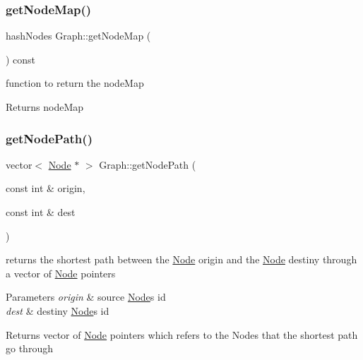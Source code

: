 \subsubsection{\texorpdfstring{get\+Node\+Map()}{getNodeMap()}}
{\footnotesize\ttfamily hash\+Nodes Graph\+::get\+Node\+Map (\begin{DoxyParamCaption}{ }\end{DoxyParamCaption}) const}



function to return the node\+Map 

\begin{DoxyReturn}{Returns}
node\+Map 
\end{DoxyReturn}
\mbox{\label{class_graph_a3afc621123c6232274a883df378e4b72}} 
\subsubsection{\texorpdfstring{get\+Node\+Path()}{getNodePath()}}
{\footnotesize\ttfamily vector$<$ \hyperlink{class_node}{Node} $\ast$ $>$ Graph\+::get\+Node\+Path (\begin{DoxyParamCaption}\item[{const int \&}]{origin,  }\item[{const int \&}]{dest }\end{DoxyParamCaption})}



returns the shortest path between the \hyperlink{class_node}{Node} origin and the \hyperlink{class_node}{Node} destiny through a vector of \hyperlink{class_node}{Node} pointers 


\begin{DoxyParams}{Parameters}
{\em origin} & source \hyperlink{class_node}{Node}\textquotesingle{}s id \\
\hline
{\em dest} & destiny \hyperlink{class_node}{Node}\textquotesingle{}s id \\
\hline
\end{DoxyParams}
\begin{DoxyReturn}{Returns}
vector of \hyperlink{class_node}{Node} pointers which refers to the Nodes that the shortest path go through 
\end{DoxyReturn}
\mbox{\label{class_graph_a85090885772616dc5865c500a9af81b6}} 
